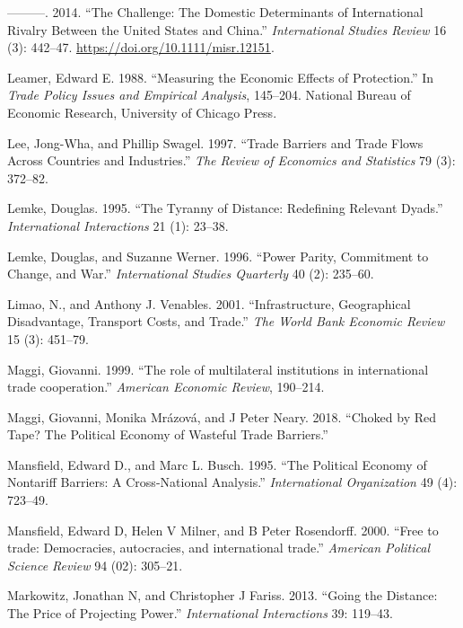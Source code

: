 \documentclass{puthesis}
\newlength{\cslhangindent}
\newenvironment{cslreferences}%
  {\setlength{\parindent}{0pt}%
  \everypar{\setlength{\hangindent}{\cslhangindent}}\ignorespaces}%
  {\par}
\begin{document}
\begin{cslreferences}
\leavevmode\hypertarget{ref-Lake2014}{}%
---------. 2014. ``The Challenge: The Domestic Determinants of
International Rivalry Between the United States and China.''
\emph{International Studies Review} 16 (3): 442--47.
\url{https://doi.org/10.1111/misr.12151}.

\leavevmode\hypertarget{ref-Leamer1988}{}%
Leamer, Edward E. 1988. ``Measuring the Economic Effects of
Protection.'' In \emph{Trade Policy Issues and Empirical Analysis},
145--204. National Bureau of Economic Research, University of Chicago
Press.

\leavevmode\hypertarget{ref-Lee1997}{}%
Lee, Jong-Wha, and Phillip Swagel. 1997. ``Trade Barriers and Trade
Flows Across Countries and Industries.'' \emph{The Review of Economics
and Statistics} 79 (3): 372--82.

\leavevmode\hypertarget{ref-Lemke1995}{}%
Lemke, Douglas. 1995. ``The Tyranny of Distance: Redefining Relevant
Dyads.'' \emph{International Interactions} 21 (1): 23--38.

\leavevmode\hypertarget{ref-Lemke1996}{}%
Lemke, Douglas, and Suzanne Werner. 1996. ``Power Parity, Commitment to
Change, and War.'' \emph{International Studies Quarterly} 40 (2):
235--60.

\leavevmode\hypertarget{ref-Limao2001}{}%
Limao, N., and Anthony J. Venables. 2001. ``Infrastructure, Geographical
Disadvantage, Transport Costs, and Trade.'' \emph{The World Bank
Economic Review} 15 (3): 451--79.

\leavevmode\hypertarget{ref-Maggi1999}{}%
Maggi, Giovanni. 1999. ``The role of multilateral institutions in
international trade cooperation.'' \emph{American Economic Review},
190--214.

\leavevmode\hypertarget{ref-Maggi2018}{}%
Maggi, Giovanni, Monika Mrázová, and J Peter Neary. 2018. ``Choked by
Red Tape? The Political Economy of Wasteful Trade Barriers.''

\leavevmode\hypertarget{ref-Mansfield1995b}{}%
Mansfield, Edward D., and Marc L. Busch. 1995. ``The Political Economy
of Nontariff Barriers: A Cross-National Analysis.'' \emph{International
Organization} 49 (4): 723--49.

\leavevmode\hypertarget{ref-Mansfield2000b}{}%
Mansfield, Edward D, Helen V Milner, and B Peter Rosendorff. 2000.
``Free to trade: Democracies, autocracies, and international trade.''
\emph{American Political Science Review} 94 (02): 305--21.

\leavevmode\hypertarget{ref-Markowitz2013}{}%
Markowitz, Jonathan N, and Christopher J Fariss. 2013. ``Going the
Distance: The Price of Projecting Power.'' \emph{International
Interactions} 39: 119--43.


\end{cslreferences}
\end{document}
